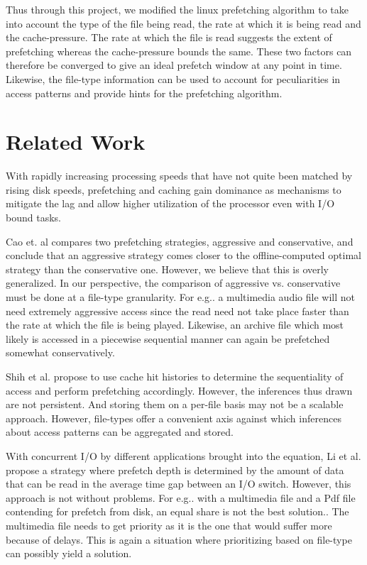\documentclass[twocolumn,10pt]{article}
\begin{document}
Thus through this project, we modified the linux prefetching
algorithm to take into account the type of the file being read,
the rate at which it is being read and the cache-pressure.
The rate at which the file is read suggests the extent of prefetching
whereas the cache-pressure bounds the same. These two factors can
therefore be converged to give an ideal prefetch window at any point
in time. Likewise, the file-type information can be used to account
for peculiarities in access patterns and provide hints for the 
prefetching algorithm.

\section{Related Work}
With rapidly increasing processing speeds that have not quite
been matched by rising disk speeds, prefetching and caching 
gain dominance as mechanisms to mitigate the lag and allow 
higher utilization of the processor even with I/O bound tasks.

Cao et. al \cite{1} compares two prefetching strategies, aggressive and conservative,
and conclude that an aggressive strategy comes closer to the offline-computed
optimal strategy than the conservative one. However, we believe that this
is overly generalized. In our perspective, the comparison of aggressive vs.
conservative must be done at a file-type granularity. For e.g.. a multimedia
audio file will not need extremely aggressive access since the read need
not take place faster than the rate at which the file is being played.
Likewise, an archive file which most likely is accessed in a piecewise
sequential manner can again be prefetched somewhat conservatively.

Shih et al. \cite{6} propose to use cache hit histories to determine the
sequentiality of access and perform prefetching accordingly. However,
the inferences thus drawn are not persistent. And storing them on a
per-file basis may not be a scalable approach. However, file-types
offer a convenient axis against which inferences about access
patterns can be aggregated and stored.

With concurrent I/O by different applications brought into the equation,
Li et al. \cite{2} propose a strategy where prefetch depth is determined by
the amount of data that can be read in the average time gap between
an I/O switch. However, this approach is not without problems. For e.g..
with a multimedia file and a Pdf file contending for prefetch from
disk, an equal share is not the best solution.. The multimedia file
needs to get priority as it is the one that would suffer more because
of delays. This is again a situation where prioritizing based on
file-type can possibly yield a solution.
\end{document}
